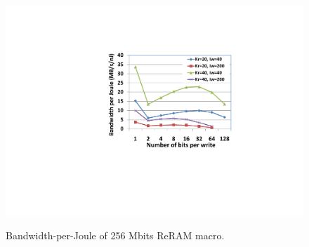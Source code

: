 

\begin{figure}[!]
\centering\label{fig:EpJ}
  \includegraphics[width=2.3 in]{./figures/EpJ2}\\
  \caption{Bandwidth-per-Joule of 256 Mbits ReRAM macro.}
  \vspace{-15pt}
\end{figure}

